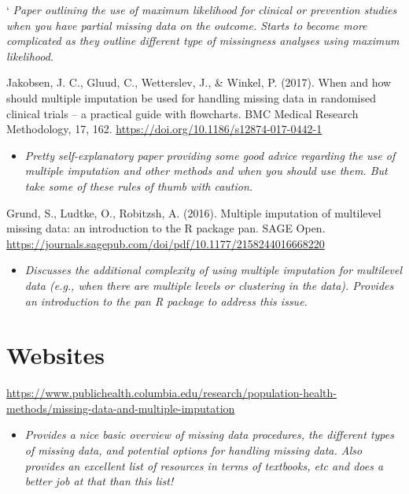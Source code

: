 \documentclass[
]{book}
\providecommand{\tightlist}{%
  \setlength{\itemsep}{0pt}\setlength{\parskip}{0pt}}
\begin{document}
` \emph{Paper outlining the use of maximum likelihood for clinical or prevention studies when you have partial missing data on the outcome. Starts to become more complicated as they outline different type of missingness analyses using maximum likelihood. }

Jakobsen, J. C., Gluud, C., Wetterslev, J., \& Winkel, P. (2017). When and how should multiple imputation be used for handling missing data in randomised clinical trials -- a practical guide with flowcharts. BMC Medical Research Methodology, 17, 162. \url{https://doi.org/10.1186/s12874-017-0442-1}

\begin{itemize}
\tightlist
\item
  \emph{Pretty self-explanatory paper providing some good advice regarding the use of multiple imputation and other methods and when you should use them. But take some of these rules of thumb with caution. }
\end{itemize}

Grund, S., Ludtke, O., Robitzsh, A. (2016). Multiple imputation of multilevel missing data: an introduction to the R package pan. SAGE Open. \url{https://journals.sagepub.com/doi/pdf/10.1177/2158244016668220}

\begin{itemize}
\tightlist
\item
  \emph{Discusses the additional complexity of using multiple imputation for multilevel data (e.g., when there are multiple levels or clustering in the data). Provides an introduction to the pan R package to address this issue. }
\end{itemize}

\section{Websites}\label{websites-4}

\url{https://www.publichealth.columbia.edu/research/population-health-methods/missing-data-and-multiple-imputation}

\begin{itemize}
\tightlist
\item
  \emph{Provides a nice basic overview of missing data procedures, the different types of missing data, and potential options for handling missing data. Also provides an excellent list of resources in terms of textbooks, etc and does a better job at that than this list! }
\end{itemize}
\end{document}
